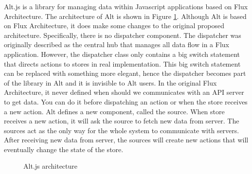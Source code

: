 Alt.js is a library for managing data within Javascript applications based on Flux Architecture. The architecture of Alt is shown in Figure \ref{figure:alt_architecture}. Although Alt is based on Flux Architecture, it does make some changes to the original proposed architecture. Specifically, there is no dispatcher component. The dispatcher was originally described as the central hub that manages all data flow in a Flux application. However, the dispatcher class only contains a big switch statement that directs actions to stores in real implementation. This big switch statement can be replaced with something more elegant, hence the dispatcher becomes part of the library in Alt and it is invisible to Alt users. In the original Flux Architecture, it never defined when should we communicates with an API server to get data. You can do it before dispatching an action or when the store receives a new action. Alt defines a new component, called the source. When store receives a new action, it will ask the source to fetch new data from server. The sources act as the only way for the whole system to communicate with servers. After receiving new data from server, the sources will create new actions that will eventually change the state of the store.

\begin{figure}[t]
\centering
{}
\caption{Alt.js architecture}
\label{figure:alt_architecture}
\end{figure}

